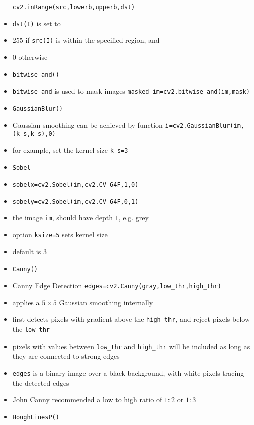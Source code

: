 \documentclass[onecolumn]{IEEEtran} %
\begin{document}
\begin{itemize}
        \verb|cv2.inRange(src,lowerb,upperb,dst)|
        \item \verb|dst(I)|  is set to
        \bi
            \item $255$ if \verb|src(I)| is within the specified region, and
            \item $0$ otherwise
        \ei
    \ei
    \item \verb|bitwise_and()|
    \bi
        \item \verb|bitwise_and| is used to mask images \newline
        \verb|masked_im=cv2.bitwise_and(im,mask)|
    \ei
    \item \verb|GaussianBlur()|
    \bi
        \item Gaussian smoothing can be achieved by function \newline
        \verb|i=cv2.GaussianBlur(im,(k_s,k_s),0)|
        \item for example, set the kernel size \verb|k_s=3|
    \ei
    \item \verb|Sobel|
    \bi
        \item \verb|sobelx=cv2.Sobel(im,cv2.CV_64F,1,0)|
        \item \verb|sobely=cv2.Sobel(im,cv2.CV_64F,0,1)|
        \item the image \verb|im|, should have depth $1$, e.g. grey
        \item option \verb|ksize=5| sets kernel size
        \bi
            \item default is $3$
        \ei
    \ei
    \item \verb|Canny()|
    \bi
        \item Canny Edge Detection  \newline
        \verb|edges=cv2.Canny(gray,low_thr,high_thr)|
        \item applies a $5\times 5$ Gaussian smoothing internally
        \item first detects pixels with gradient above the \verb|high_thr|, and reject pixels below the \verb|low_thr|
        \bi
            \item pixels with values between \verb|low_thr| and \verb|high_thr| will be included as long as they are connected to strong edges
        \ei
        \item \verb|edges| is a binary image over a black background, with white pixels tracing the detected edges
        \item John Canny recommended a low to high ratio of $1:2$ or $1:3$
    \ei
    \item \verb|HoughLinesP()|

\end{itemize}
\end{document}
